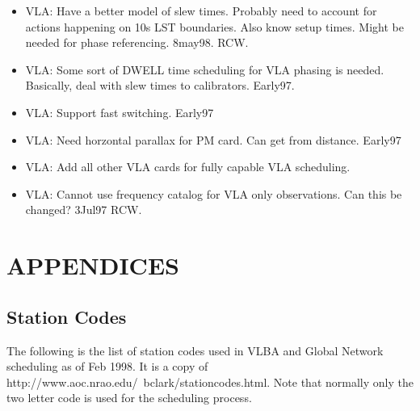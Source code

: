\documentclass{report}
\begin{document}
\begin{itemize}
\item VLA:  Have a better model of slew times.  Probably need to account
      for actions happening on 10s LST boundaries.  Also know setup times.
      Might be needed for phase referencing.  8may98. RCW.

\item VLA:  Some sort of DWELL time scheduling for VLA phasing
      is needed.  Basically, deal with slew times to calibrators.  Early97.

\item VLA:  Support fast switching.  Early97

\item VLA:  Need horzontal parallax for PM card.  Can get from
      distance.  Early97

\item VLA:  Add all other VLA cards for fully capable VLA scheduling.

\item VLA:  Cannot use frequency catalog for VLA only observations.
      Can this be changed?  3Jul97 RCW.

\end{itemize}


\appendix

\chapter{\label{APP:APPENDICES}APPENDICES}


\section{\label{APP:STACODES}Station Codes}

The following is the list of station codes used in VLBA and Global
Network scheduling as of Feb 1998.  It is a copy of
{http://www.aoc.nrao.edu/~bclark/stationcodes.html}.
Note that normally only the two letter code is used for the
scheduling process.
\end{document}

